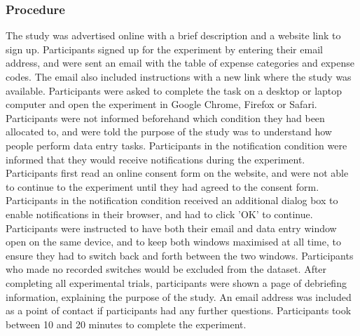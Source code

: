 \subsubsection{Procedure}
The study was advertised online with a brief description and a website link to sign up. Participants signed up for the experiment by entering their email address, and were sent an email with the table of expense categories and expense codes. The email also included instructions with a new link where the study was available. Participants were asked to complete the task on a desktop or laptop computer and open the experiment in Google Chrome, Firefox or Safari. Participants were not informed beforehand which condition they had been allocated to, and were told the purpose of the study was to understand how people perform data entry tasks. Participants in the notification condition were informed that they would receive notifications during the experiment. 
Participants first read an online consent form on the website, and were not able to continue to the experiment until they had agreed to the consent form. Participants in the notification condition received an additional dialog box to enable notifications in their browser, and had to click 'OK' to continue. Participants were instructed to have both their email and data entry window open on the same device, and to keep both windows maximised at all time, to ensure they had to switch back and forth between the two windows. Participants who made no recorded switches would be excluded from the dataset. 
After completing all experimental trials, participants were shown a page of debriefing information, explaining the purpose of the study. An email address was included as a point of contact if participants had any further questions. Participants took between 10 and 20 minutes to complete the experiment.

